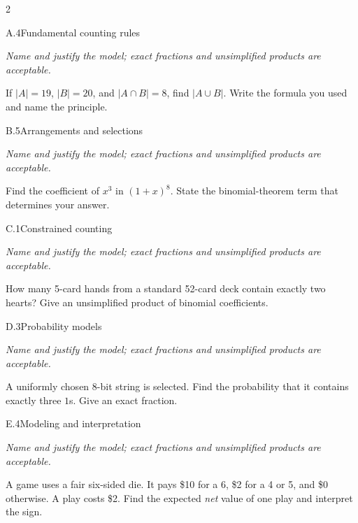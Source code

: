 \documentclass[9pt]{extarticle}
\begin{document}
\begin{multicols}{2}
\begin{CoreProblem}{A.4}{Fundamental counting rules}
{\scriptsize\textit{Name and justify the model; exact fractions and unsimplified products are acceptable.}\par}
If $|A|=19$, $|B|=20$, and $|A\cap B|=8$, find $|A\cup B|$. Write
    the formula you used and name the principle.
\end{CoreProblem}
\begin{CoreProblem}{B.5}{Arrangements and selections}
{\scriptsize\textit{Name and justify the model; exact fractions and unsimplified products are acceptable.}\par}
Find the coefficient of $x^3$ in $(1+x)^8$. State the binomial-theorem
    term that determines your answer.
\end{CoreProblem}
\begin{CoreProblem}{C.1}{Constrained counting}
{\scriptsize\textit{Name and justify the model; exact fractions and unsimplified products are acceptable.}\par}
How many 5-card hands from a standard 52-card deck contain exactly
    two hearts? Give an unsimplified product of binomial coefficients.
\end{CoreProblem}
\columnbreak
\begin{CoreProblem}{D.3}{Probability models}
{\scriptsize\textit{Name and justify the model; exact fractions and unsimplified products are acceptable.}\par}
A uniformly chosen 8-bit string is selected. Find the probability
    that it contains exactly three $1$s. Give an exact fraction.
\end{CoreProblem}
\begin{CoreProblem}{E.4}{Modeling and interpretation}
{\scriptsize\textit{Name and justify the model; exact fractions and unsimplified products are acceptable.}\par}
A game uses a fair six-sided die. It pays \$10 for a 6, \$2 for a 4
    or 5, and \$0 otherwise. A play costs \$2. Find the expected \emph{net}
    value of one play and interpret the sign.
\end{CoreProblem}
\end{multicols}
\CoreWorkArea
\FormBreak
{}
\end{document}
